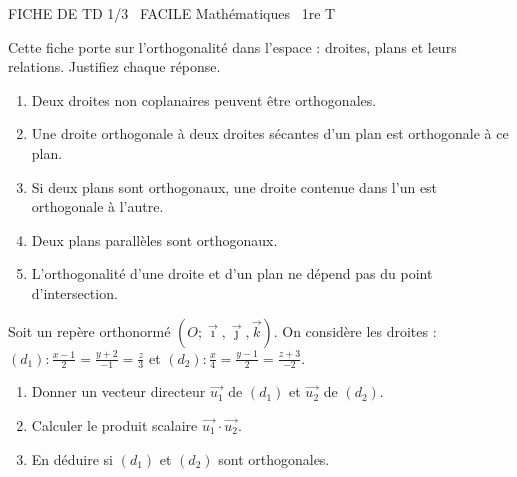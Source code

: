 \documentclass[11pt]{article}
\begin{document}
\begin{tcolorbox}[enhanced,colback=popink,colframe=popink,arc=10pt,boxrule=0pt,left=12pt,right=12pt,top=9pt,bottom=9pt]
{\color{white}\popxbold\small FICHE DE TD 1/3 \textbullet\ FACILE \hfill Mathématiques \textbullet\ 1re T\par}
\end{tcolorbox}
\vspace{4pt}
Cette fiche porte sur l'orthogonalité dans l'espace : droites, plans et leurs relations. Justifiez chaque réponse.

\begin{exercice}
\begin{enumerate}
    \item Deux droites non coplanaires peuvent être orthogonales.
    \item Une droite orthogonale à deux droites sécantes d'un plan est orthogonale à ce plan.
    \item Si deux plans sont orthogonaux, une droite contenue dans l'un est orthogonale à l'autre.
    \item Deux plans parallèles sont orthogonaux.
    \item L'orthogonalité d'une droite et d'un plan ne dépend pas du point d'intersection.
\end{enumerate}
\end{exercice}

\begin{exercice}
Soit un repère orthonormé $(O;\vec{\imath},\vec{\jmath},\vec{k})$. On considère les droites :
$(d_1) : \frac{x-1}{2}=\frac{y+2}{-1}=\frac{z}{3}$ et $(d_2) : \frac{x}{4}=\frac{y-1}{2}=\frac{z+3}{-2}$.
\begin{enumerate}
    \item Donner un vecteur directeur $\vec{u_1}$ de $(d_1)$ et $\vec{u_2}$ de $(d_2)$.
    \item Calculer le produit scalaire $\vec{u_1}\cdot\vec{u_2}$.
    \item En déduire si $(d_1)$ et $(d_2)$ sont orthogonales.
\end{enumerate}
\end{exercice}
\end{document}
